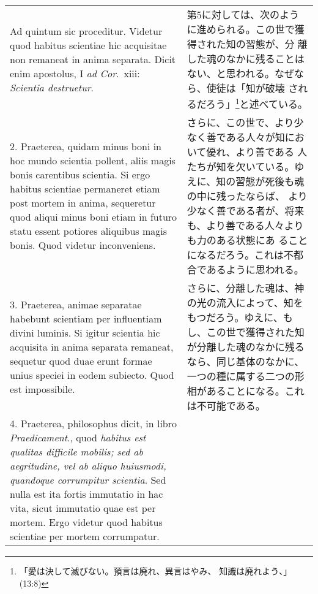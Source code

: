 \documentclass[10pt]{jsarticle} %
\begin{document}
\begin{longtable}{p{21em}p{21em}}



{\huge A}{\sc d quintum sic proceditur}. Videtur quod habitus
scientiae hic acquisitae non remaneat in anima separata. Dicit enim
apostolus, I {\it ad Cor}.~{\sc xiii}: {\it Scientia destruetur}.


&

第5に対しては、次のように進められる。この世で獲得された知の習態が、分
離した魂のなかに残ることはない、と思われる。なぜなら、使徒は「知が破壊
されるだろう」\footnote{「愛は決して滅びない。預言は廃れ、異言はやみ、
知識は廃れよう、」(13:8)}と述べている。

\\




2. {\sc Praeterea}, quidam minus boni in hoc mundo scientia pollent,
aliis magis bonis carentibus scientia. Si ergo habitus scientiae
permaneret etiam post mortem in anima, sequeretur quod aliqui minus
boni etiam in futuro statu essent potiores aliquibus magis bonis. Quod
videtur inconveniens.


&

さらに、この世で、より少なく善である人々が知において優れ、より善である
人たちが知を欠いている。ゆえに、知の習態が死後も魂の中に残ったならば、
より少なく善である者が、将来も、より善である人々よりも力のある状態にあ
ることになるだろう。これは不都合であるように思われる。

\\


3. {\sc Praeterea}, animae separatae habebunt scientiam per
influentiam divini luminis. Si igitur scientia hic acquisita in anima
separata remaneat, sequetur quod duae erunt formae unius speciei in
eodem subiecto. Quod est impossibile.


&

さらに、分離した魂は、神の光の流入によって、知をもつだろう。ゆえに、も
し、この世で獲得された知が分離した魂のなかに残るなら、同じ基体のなかに、
一つの種に属する二つの形相があることになる。これは不可能である。

\\


4. {\sc Praeterea}, philosophus dicit, in libro {\it Praedicament}.,
quod {\it habitus est qualitas difficile mobilis; sed ab aegritudine,
vel ab aliquo huiusmodi, quandoque corrumpitur scientia}. Sed nulla
est ita fortis immutatio in hac vita, sicut immutatio quae est per
mortem. Ergo videtur quod habitus scientiae per mortem corrumpatur.



\end{longtable}
\end{document}
